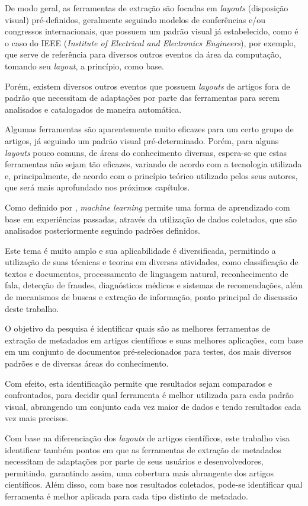 De modo geral, as ferramentas de extração são focadas em \textit{layouts} (disposição visual) pré-definidos, geralmente seguindo modelos de conferências e/ou congressos internacionais, que possuem um padrão visual já estabelecido, como é o caso do IEEE (\textit{Institute of Electrical and Electronics Engineers}), por exemplo, que serve de referência para diversos outros eventos da área da computação, tomando seu \textit{layout}, a princípio, como base.

Porém, existem diversos outros eventos que possuem \textit{layouts} de artigos fora de padrão que necessitam de adaptações por parte das ferramentas para serem analisados e catalogados de maneira automática. 

Algumas ferramentas são aparentemente muito eficazes para um certo grupo de artigos, já seguindo um padrão visual pré-determinado. Porém, para alguns \textit{layouts} pouco comuns, de áreas do conhecimento diversas, espera-se que estas ferramentas não sejam tão eficazes, variando de acordo com a tecnologia utilizada e, principalmente, de acordo com o princípio teórico utilizado pelos seus autores, que será mais aprofundado nos próximos capítulos.

Como definido por \cite{foundations-machine-learning}, \textit{machine learning} permite uma forma de aprendizado com base em experiências passadas, através da utilização de dados coletados, que são analisados posteriormente seguindo padrões definidos.

Este tema é muito amplo e sua aplicabilidade é diversificada, permitindo a utilização de suas técnicas e teorias em diversas atividades, como classificação de textos e documentos, processamento de linguagem natural, reconhecimento de fala, detecção de fraudes, diagnósticos médicos e sistemas de recomendações, além de mecanismos de buscas e extração de informação, ponto principal de discussão deste trabalho.

O objetivo da pesquisa é identificar quais são as melhores ferramentas de extração de metadados em artigos científicos e suas melhores aplicações, com base em um conjunto de documentos pré-selecionados para testes, dos mais diversos padrões e de diversas áreas do conhecimento.

Com efeito, esta identificação permite que resultados sejam comparados e confrontados, para decidir qual ferramenta é melhor utilizada para cada padrão visual, abrangendo um conjunto cada vez maior de dados e tendo resultados cada vez mais precisos.

Com base na diferenciação dos \textit{layouts} de artigos científicos, este trabalho visa identificar também pontos em que as ferramentas de extração de metadados necessitam de adaptações por parte de seus usuários e desenvolvedores, permitindo, garantindo assim, uma cobertura mais abrangente dos artigos científicos. Além disso, com base nos resultados coletados, pode-se identificar qual ferramenta é melhor aplicada para cada tipo distinto de metadado.

